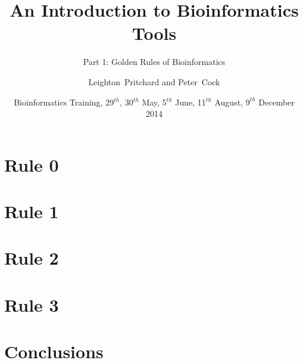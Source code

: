 %




\title[Intro to Bioinformatics] %
{An Introduction to Bioinformatics Tools}
\subtitle{Part 1: Golden Rules of Bioinformatics}
\author[Pritchard, Cock] %
{Leighton~Pritchard and Peter~Cock}
\date[May, June, August, December 2014] %
{Bioinformatics Training, 29$^{th}$, 30$^{th}$ May, 5$^{th}$ June, 11$^{th}$ August, $9^{th}$ December 2014}
\subject{Bioinformatics}





\frame[plain]{\titlepage}
  
%
    
\section{Rule 0}
  

\section{Rule 1}
  
    

\section{Rule 2}
  
    

\section{Rule 3}
  
    

%


\section{Conclusions}
    


